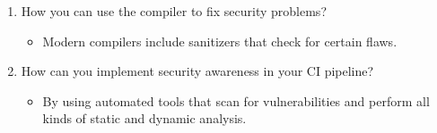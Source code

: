 \begin{enumerate}
\item
How you can use the compiler to fix security problems?
\begin{itemize}
\item 
Modern compilers include sanitizers that check for certain flaws.
\end{itemize}

\item
How can you implement security awareness in your CI pipeline?
\begin{itemize}
\item 
By using automated tools that scan for vulnerabilities and perform all kinds of static and dynamic analysis.
\end{itemize}
\end{enumerate}